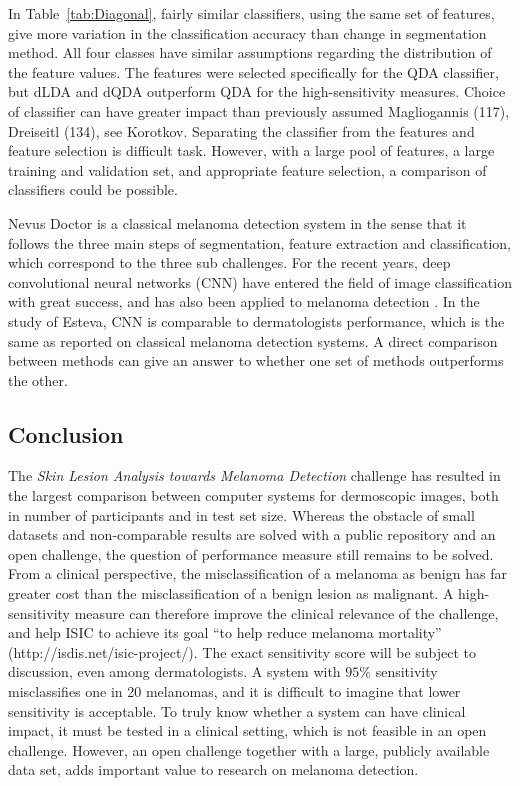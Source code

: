 \documentclass[a4paper,12pt]{article}
\begin{document}
In Table~\ref{tab:Diagonal}, fairly similar classifiers, using the same set of features, give more variation in the classification accuracy than change in segmentation method. 
All four classes have similar assumptions regarding the distribution of the feature values. 
The features were selected specifically for the QDA classifier, but dLDA and dQDA outperform QDA for the high-sensitivity measures. 
Choice of classifier can have greater impact than previously assumed {\color{red} Magliogannis (117), Dreiseitl (134), see Korotkov}.
Separating the classifier from the features and feature selection is difficult task.
However, with a large pool of features, a large training and validation set, and appropriate feature selection, a comparison of classifiers could be possible. 

Nevus Doctor is a classical melanoma detection system in the sense that it follows the three main steps of segmentation, feature extraction and classification, which correspond to the three sub challenges.  
For the recent years, deep convolutional neural networks (CNN) have entered the field of image classification with great success, and has also been applied to melanoma detection \cite{Esteva2017Dermatologistlevel}. 
In the study of Esteva, CNN is comparable to dermatologists performance, which is the same as reported on classical melanoma detection systems.
A direct comparison between methods can give an answer to whether one set of methods outperforms the other. 

\subsection{Conclusion}

The {\it Skin Lesion Analysis towards Melanoma Detection} challenge has resulted in the largest comparison between computer systems for dermoscopic images, both in number of participants and in test set size. 
Whereas the obstacle of small datasets and non-comparable results are solved with a public repository and an open challenge, the question of performance measure still remains to be solved. 
From a clinical perspective, the misclassification of a melanoma as benign has far greater cost than the misclassification of a benign lesion as malignant. 
A high-sensitivity measure can therefore improve the clinical relevance of the challenge, and help ISIC to achieve its goal ``to help reduce melanoma mortality'' (http://isdis.net/isic-project/). 
The exact sensitivity score will be subject to discussion, even among dermatologists. 
A system with $95\%$ sensitivity misclassifies one in 20 melanomas, and it is difficult to imagine that lower sensitivity is acceptable. 
To truly know whether a system can have clinical impact, it must be tested in a clinical setting, which is not feasible in an open challenge. 
However, an open challenge together with a large, publicly available data set, adds important value to research on melanoma detection.
\end{document}
